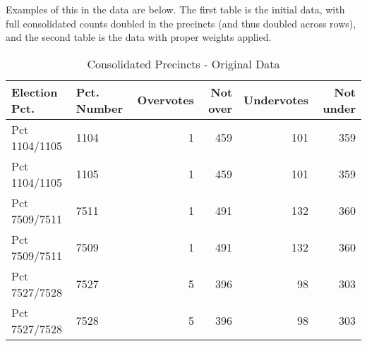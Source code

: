 \documentclass[12pt,twoside]{reedthesis}
\newenvironment{Shaded}{\begin{snugshade}}{\end{snugshade}}
\newcommand{\DataTypeTok}[1]{\textcolor[rgb]{0.13,0.29,0.53}{#1}}
\newcommand{\DecValTok}[1]{\textcolor[rgb]{0.00,0.00,0.81}{#1}}
\newcommand{\KeywordTok}[1]{\textcolor[rgb]{0.13,0.29,0.53}{\textbf{#1}}}
\newcommand{\NormalTok}[1]{#1}
\newcommand{\OperatorTok}[1]{\textcolor[rgb]{0.81,0.36,0.00}{\textbf{#1}}}
\newcommand{\OtherTok}[1]{\textcolor[rgb]{0.56,0.35,0.01}{#1}}
\newcommand{\StringTok}[1]{\textcolor[rgb]{0.31,0.60,0.02}{#1}}
\theoremstyle{definition}
\theoremstyle{definition}
\theoremstyle{definition}
\theoremstyle{remark}
\begin{document}
Examples of this in the data are below. The first table is the initial
data, with full consolidated counts doubled in the precincts (and thus
doubled across rows), and the second table is the data with proper
weights applied.
\begin{Shaded}
\end{Shaded}
\begin{longtable}[t]{llrrrr}
\caption[Combined Precincts - Original]{\label{tab:unnamed-chunk-3}Consolidated Precincts - Original Data}\\
\toprule
Election Pct. & Pct. Number & Overvotes & Not over & Undervotes & Not under\\
\midrule
Pct 1104/1105 & 1104 & 1 & 459 & 101 & 359\\
Pct 1104/1105 & 1105 & 1 & 459 & 101 & 359\\
Pct 7509/7511 & 7511 & 1 & 491 & 132 & 360\\
Pct 7509/7511 & 7509 & 1 & 491 & 132 & 360\\
Pct 7527/7528 & 7527 & 5 & 396 & 98 & 303\\
Pct 7527/7528 & 7528 & 5 & 396 & 98 & 303\\
\bottomrule
\end{longtable}
\end{document}
